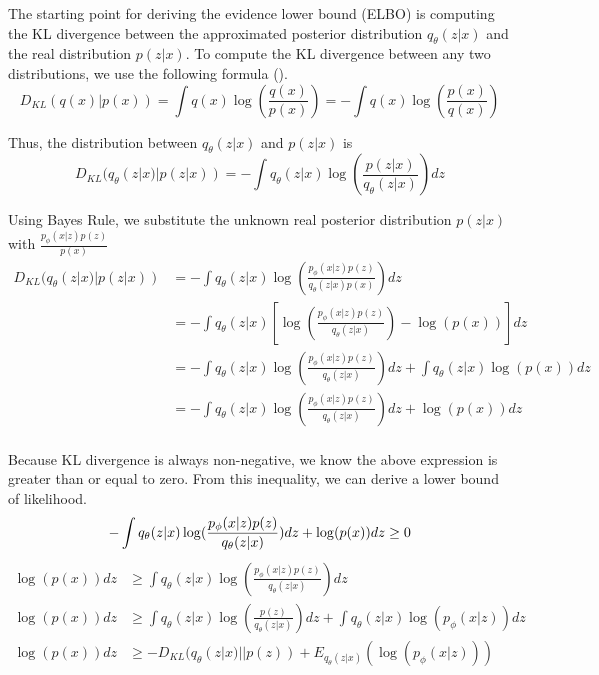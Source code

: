 \documentclass[./dissertation.tex]{subfiles}
\begin{document}
    The starting point for deriving the evidence lower bound (ELBO) is computing the KL divergence between the approximated posterior distribution $q_{\theta}(z|x)$ and the real distribution $p(z|x)$. To compute the KL divergence between any two distributions, we use the following formula (\cite{odaibo2019tutorial}). 
    \begin{equation*}
        D_{KL}(q(x)|p(x)) = \int q(x)\log(\frac{q(x)}{p(x)}) = - \int q(x)\log(\frac{p(x)}{q(x)})
    \end{equation*}
    
    Thus, the distribution between $q_{\theta}(z|x)$ and $p(z|x)$ is
    \begin{equation*}
        D_{KL}(q_{\theta}(z|x)|p(z|x)) = - \int q_{\theta}(z|x)\log(\frac{p(z|x)}{q_{\theta}(z|x)})dz
    \end{equation*}
    
    Using Bayes Rule, we substitute the unknown real posterior distribution $p(z|x)$ with $\frac{p_{\phi}(x|z)p(z)}{p(x)}$
    \begin{equation*}
    \begin{aligned}
        D_{KL}(q_{\theta}(z|x)|p(z|x)) &= - \int q_{\theta}(z|x)\log(\frac{p_{\phi}(x|z)p(z)}{q_{\theta}(z|x)p(x)})dz \\
        &= - \int q_{\theta}(z|x)[\log(\frac{p_{\phi}(x|z)p(z)}{q_{\theta}(z|x)}) - \log(p(x))]dz \\
        &= - \int q_{\theta}(z|x)\log(\frac{p_{\phi}(x|z)p(z)}{q_{\theta}(z|x)})dz + \int q_{\theta}(z|x)\log(p(x))dz \\
        &= - \int q_{\theta}(z|x)\log(\frac{p_{\phi}(x|z)p(z)}{q_{\theta}(z|x)})dz + \log(p(x))dz \\
    \end{aligned}
    \end{equation*}
    
    Because KL divergence is always non-negative, we know the above expression is greater than or equal to zero. From this inequality, we can derive a lower bound of likelihood.
    \begin{equation*}
    - \int q_{\theta}(z|x)\log(\frac{p_{\phi}(x|z)p(z)}{q_{\theta}(z|x)})dz + \log(p(x))dz \geq 0 \\
    \end{equation*}
    \begin{equation*}
    \begin{aligned}
    \log(p(x))dz &\geq \int q_{\theta}(z|x)\log(\frac{p_{\phi}(x|z)p(z)}{q_{\theta}(z|x)})dz \\
    \log(p(x))dz &\geq \int q_{\theta}(z|x)\log(\frac{p(z)}{q_{\theta}(z|x)})dz + \int q_{\theta}(z|x)\log(p_{\phi}(x|z))dz \\
    \log(p(x))dz &\geq -D_{KL}(q_{\theta}(z|x)||p(z)) + E_{q_{\theta}(z|x)}(\log(p_{\phi}(x|z)))
    \end{aligned}
    \end{equation*}
    
\end{document}
